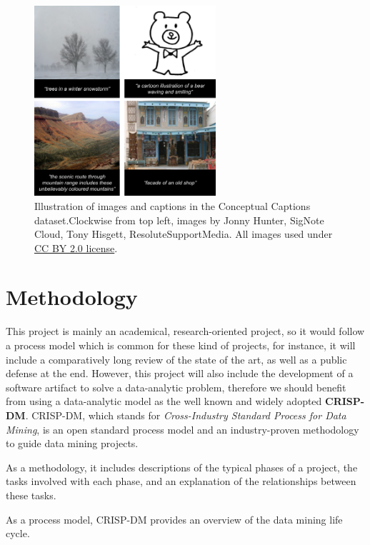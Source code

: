 \begin{figure}[h]
	\centering
	\includegraphics[width=0.6\textwidth]{figs/ch1/conceptual-captions-example.png}
	\caption{Illustration of images and captions in the Conceptual Captions dataset.Clockwise from top left, images by Jonny Hunter, SigNote Cloud, Tony Hisgett, ResoluteSupportMedia. All images used under \href{https://creativecommons.org/licenses/by/2.0/}{CC BY 2.0 license}.}
	\label{fig:conceptual-captions}
\end{figure}

\section{Methodology}

This project is mainly an academical, research-oriented project, so it would follow a process model which is common for these kind of projects, for instance, it will include a comparatively long review of the state of the art, as well as a public defense at the end. However, this project will also include the development of a software artifact to solve a data-analytic problem, therefore we should benefit from using a data-analytic model as the well known and widely adopted \textbf{CRISP-DM}. CRISP-DM, which stands for \textit{Cross-Industry Standard Process for Data Mining}, is an open standard process model and an industry-proven methodology to guide data mining projects.

As a methodology, it includes descriptions of the typical phases of a project, the tasks involved with each phase, and an explanation of the relationships between these tasks.

As a process model, CRISP-DM provides an overview of the data mining life cycle.


